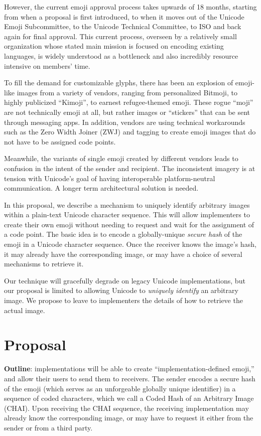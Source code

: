 \documentclass[12pt]{article}
\begin{document}
However, the current emoji approval process takes upwards of 18 months, starting from when a proposal is first introduced, to when it moves out of the Unicode Emoji Subcommittee, to the Unicode Technical Committee, to ISO and back again for final approval. This current process, overseen by a relatively small organization whose stated main mission is focused on encoding existing languages, is widely understood as a bottleneck and also incredibly resource intensive on members’ time.

To fill the demand for customizable glyphs, there has been an explosion of emoji-like images from a variety of vendors, ranging from personalized Bitmoji, to highly publicized “Kimoji”, to earnest refugee-themed emoji. These rogue “moji” are not technically emoji at all, but rather images or “stickers” that can be sent through messaging apps. In addition, vendors are using technical workarounds such as the Zero Width Joiner (ZWJ) and tagging to create emoji images that do not have to be assigned code points.

Meanwhile, the variants of single emoji created by different vendors leads to confusion in the intent of the sender and recipient.\autocite{EmojiVarying} The inconsistent imagery is at tension with Unicode’s goal of having interoperable platform-neutral communication. 
A longer term architectural solution is needed. 

In this proposal, we describe a mechanism to uniquely identify
arbitrary images within a plain-text Unicode character sequence. This
will allow implementers to create their own emoji without needing to
request and wait for the assignment of a code point. The basic idea is
to encode a globally-unique \emph{secure hash} of the emoji in a
Unicode character sequence. Once the receiver knows the image's hash,
it may already have the corresponding image, or may have a choice of
several mechanisms to retrieve it.

Our technique will gracefully degrade on legacy Unicode
implementations, but our proposal is limited to allowing Unicode to
\emph{uniquely identify} an arbitrary image. We propose to leave to
implementers the details of how to retrieve the actual image.

\section{Proposal}

\textbf{Outline}: implementations will be able to create
``implementation-defined emoji,'' and allow their users to send them
to receivers. The sender encodes a secure hash of the emoji (which
serves as an unforgeable globally unique identifier) in a sequence of
coded characters, which we call a Coded Hash of an Arbitrary Image
(CHAI). Upon receiving the CHAI sequence, the receiving implementation
may already know the corresponding image, or may have to request it
either from the sender or from a third party.
\end{document}
